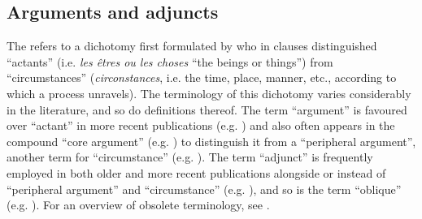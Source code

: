 \subsection{Arguments and adjuncts} \label{arguments-adjuncts}
The  refers to a dichotomy first formulated by \cite[102]{tesniere:1959} who in clauses distinguished “actants” (i.e. \textit{les êtres ou les choses} “the beings or things”) from “circumstances” (\textit{circonstances}, i.e. the time, place, manner, etc., according to which a process unravels). The terminology of this dichotomy varies considerably in the literature, and so do definitions thereof. The term “argument” is favoured over “actant” in more recent publications (e.g. \citealt{comrie:1993, kazenin:1994, dik:1997, croft:2001, croft:2012, haspelmath:muller-bardey:2004, kulikov:2010, wichmann:2014, haspelmath:hartmann:2015}) and also often appears in the compound “core argument” (e.g. \citealt{dixon:2000, dixon:aikhenvald:2000, kazenin:2001a, van-valin:2001, van-valin:2005, peterson:2007, malchukov:2015, malchukov:2016}) to distinguish it from a “peripheral argument”, another term for “circumstance” (e.g. \citealt{dixon:2000, dixon:aikhenvald:2000, peterson:2007, malchukov:2016}). The term “adjunct” is frequently employed in both older and more recent publications alongside or instead of “peripheral argument” and “circumstance” (e.g. \citealt{vater:1978, comrie:1993, croft:2001, croft:2012, van-valin:2001, van-valin:2005, peterson:2007, wichmann:2014, haspelmath:hartmann:2015, malchukov:2015}), and so is the term “oblique” (e.g. \citealt{cooreman:1994, kazenin:1994, kazenin:2001a, haspelmath:muller-bardey:2004, peterson:2007, kulikov:2010, malchukov:2015}). For an overview of obsolete terminology, see \cite[508]{somers:1984}. 

